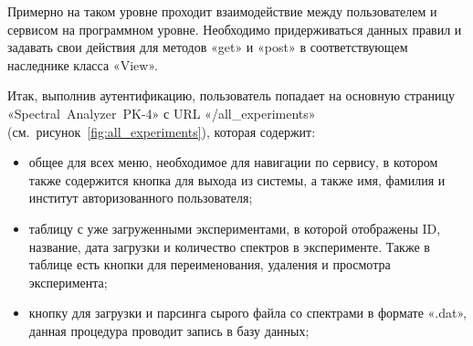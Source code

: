 Примерно на таком уровне проходит взаимодействие между пользователем и сервисом на программном уровне.
Необходимо придерживаться данных правил и задавать свои действия для методов «get» и «post» в соответствующем
наследнике класса «View».

Итак, выполнив аутентификацию, пользователь попадает на основную страницу «Spectral~Analyzer~PK-4» с URL «/all\_experiments»
(см.~рисунок~\ref{fig:all_experiments}), которая содержит:
\begin{itemize}
\item общее для всех меню, необходимое для навигации по сервису, в котором также содержится кнопка для выхода из системы,
а также имя, фамилия и институт авторизованного пользователя;
\item таблицу с уже загруженными экспериментами, в которой отображены ID, название, дата загрузки и количество спектров
в эксперименте. Также в таблице есть кнопки для переименования, удаления и просмотра эксперимента;
\item кнопку для загрузки и парсинга сырого файла со спектрами в формате «.dat», данная процедура проводит запись в базу
данных;
\end{itemize}

